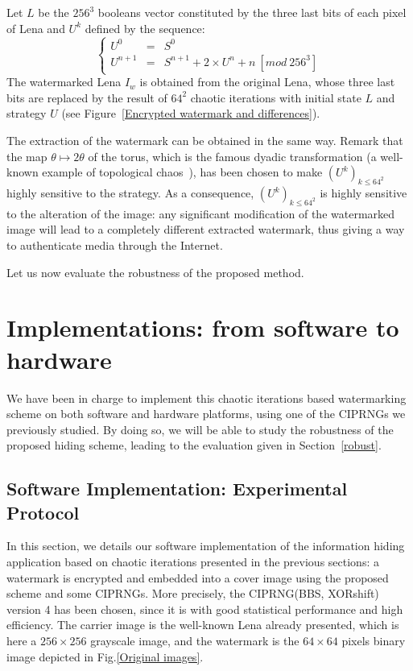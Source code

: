 Let $L$ be the $256^3$ booleans vector constituted by the three last bits of each pixel of Lena and $U^k$ defined by the sequence:
\begin{equation}
\left\{
\begin{array}{lll}
U^{0} & = & S^{0} \\
U^{n+1} & = & S^{n+1}+2\times U^{n}+n ~ [mod ~ 256^3]%
\end{array}%
\right.
\end{equation}
The watermarked Lena $I_w$ is obtained from the original Lena, whose three last bits are replaced by the result of $64^2$ chaotic iterations with initial state $L$ and strategy $U$ (see Figure~\ref{Encrypted watermark and differences}).

The extraction of the watermark can be obtained in the same way. Remark that the map $\theta \mapsto 2\theta $ of the torus, which is the famous dyadic transformation (a well-known example of topological chaos~\cite{Dev89}), has been chosen to make $(U^{k})_{k \leqslant 64^2}$ highly sensitive to the strategy. As a consequence, $(U^{k})_{k \leqslant 64^2}$ is highly sensitive to the alteration of the image: any significant modification of the watermarked image will lead to a completely different extracted watermark, thus giving a way to authenticate media through the Internet.


Let us now evaluate the robustness of the proposed method.

\section{Implementations: from software to hardware}

We have been in charge to implement this chaotic iterations based watermarking
scheme on both software and hardware platforms, using one of the CIPRNGs we
previously studied. By doing so, we will be able to study the robustness
of the proposed hiding scheme, leading to the evaluation given in Section~\ref{robust}.

\subsection{Software Implementation: Experimental Protocol}

In this section, we details our software implementation of the information hiding application
 based on chaotic iterations presented in the previous sections: a watermark is encrypted and embedded into a cover image using the proposed scheme and some CIPRNGs. More precisely,
the CIPRNG(BBS, XORshift) version 4 has been chosen, since it is with good statistical performance and high efficiency.  The carrier image is the well-known Lena
already presented, which is here a $256 \times 256$ grayscale image, and the watermark is the $64\times 64$ pixels binary image depicted in Fig.\ref{Original images}.


